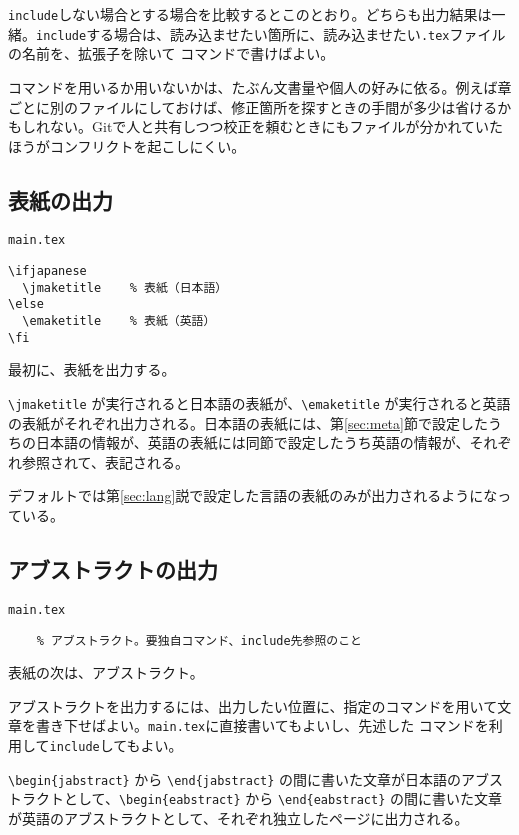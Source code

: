 {\tt include}しない場合とする場合を比較するとこのとおり。どちらも出力結果は一緒。{\tt include}する場合は、読み込ませたい箇所に、読み込ませたい{\tt *.tex}ファイルの名前を、拡張子を除いて \verb|| コマンドで書けばよい。

\verb|| コマンドを用いるか用いないかは、たぶん文書量や個人の好みに依る。例えば章ごとに別のファイルにしておけば、修正箇所を探すときの手間が多少は省けるかもしれない。Gitで人と共有しつつ校正を頼むときにもファイルが分かれていたほうがコンフリクトを起こしにくい。


\subsection{表紙の出力}

\begin{itembox}[l]{{\tt main.tex}}
\begin{verbatim}
\ifjapanese
  \jmaketitle    % 表紙（日本語）
\else
  \emaketitle    % 表紙（英語）
\fi
\end{verbatim}
\end{itembox}

最初に、表紙を出力する。

\verb|\jmaketitle| が実行されると日本語の表紙が、\verb|\emaketitle| が実行されると英語の表紙がそれぞれ出力される。日本語の表紙には、第\ref{sec:meta}節で設定したうちの日本語の情報が、英語の表紙には同節で設定したうち英語の情報が、それぞれ参照されて、表記される。

デフォルトでは第\ref{sec:lang}説で設定した言語の表紙のみが出力されるようになっている。

\subsection{アブストラクトの出力}

\begin{itembox}[l]{{\tt main.tex}}
\begin{verbatim}
	% アブストラクト。要独自コマンド、include先参照のこと
\end{verbatim}
\end{itembox}

表紙の次は、アブストラクト。

アブストラクトを出力するには、出力したい位置に、指定のコマンドを用いて文章を書き下せばよい。{\tt main.tex}に直接書いてもよいし、先述した \verb|| コマンドを利用して{\tt include}してもよい。

\verb|\begin{jabstract}| から \verb|\end{jabstract}| の間に書いた文章が日本語のアブストラクトとして、\verb|\begin{eabstract}| から \verb|\end{eabstract}| の間に書いた文章が英語のアブストラクトとして、それぞれ独立したページに出力される。

